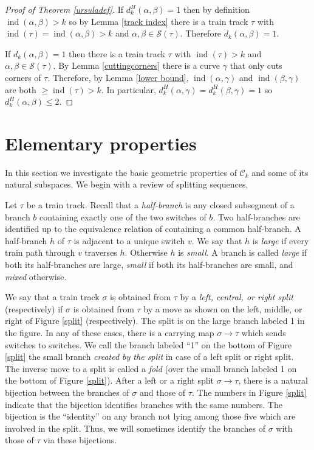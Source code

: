 \documentclass[11pt]{article}
\theoremstyle{remark}
\def\S{{\mathcal S}}
\def\C{{\mathcal C}}
\def\ind{\operatorname{ind}}
\begin{document}
\begin{proof}[Proof of Theorem \ref{ursuladef}]
If $d^H_k(\alpha, \beta) = 1$ then by definition $\ind(\alpha, \beta) > k$ so by Lemma \ref{track index} there is a train track $\tau$ with $\ind(\tau) = \ind(\alpha,\beta) > k$ and $\alpha, \beta \in \S(\tau)$. Therefore $d_k(\alpha,\beta) = 1$.

If $d_k(\alpha, \beta) = 1$ then there is a train track $\tau$ with $\ind(\tau) > k$ and $\alpha, \beta \in \S(\tau)$. By Lemma \ref{cuttingcorners} there is a curve $\gamma$ that only cuts corners of $\tau$. Therefore, by Lemma \ref{lower bound}, $\ind(\alpha, \gamma)$ and $\ind(\beta, \gamma)$ are both $\ge \ind(\tau) > k$. In particular, $d^H_k(\alpha, \gamma) = d^H_k(\beta,\gamma) = 1$ so $d^H_k(\alpha,\beta) \le 2$.
\end{proof}






\section{Elementary properties}

In this section we investigate the basic geometric properties of $\C_k$ and
some of its natural subspaces. We begin with a review of splitting sequences.

Let $\tau$ be a train track. Recall that a \emph{half-branch} is any closed
subsegment of a branch $b$ containing exactly one of the two switches of $b$.
Two half-branches are identified up to the equivalence relation of containing a
common half-branch. A half-branch $h$ of $\tau$ is adjacent to a unique switch $v$.
We say that $h$ is \emph{large} if every train path through $v$ traverses $h$.
Otherwise $h$ is \emph{small}. A branch is called \emph{large}
if both its half-branches are large, \emph{small} if both its half-branches are small,
and \emph{mixed} otherwise.


We say that  a train track $\sigma$ is obtained from $\tau$ by a
\emph{left, central, or right split} (respectively) if $\sigma$ is obtained from
$\tau$ by a move as shown on the left, middle, or right of Figure \ref{split}
(respectively). The split is on the large branch labeled 1 in the figure.
In any of these cases, there is a carrying map $\sigma \to \tau$ which sends switches
to switches.
We call the branch labeled ``1'' on the bottom of Figure \ref{split} the
small branch \emph{created by the split} in case of a left split or right split.
The inverse move to a split is called a \emph{fold} (over the small
branch labeled 1 on the bottom of Figure \ref{split}).
After a left or a right split $\sigma\to \tau$,
there is a natural bijection between the branches of $\sigma$ and those of $\tau$.
The numbers in Figure \ref{split}
indicate that the bijection identifies branches with the same numbers.
The bijection is the ``identity'' on any branch not lying among those five
which are involved in the split. Thus, we will sometimes identify
the branches of $\sigma$ with those of $\tau$ via these bijections.
\end{document}
